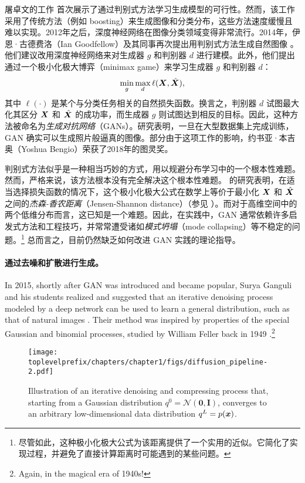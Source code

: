 \documentclass[../../book-main_zh.tex]{subfiles}
\begin{document}
屠卓文的工作 \cite{Tu-2007} 首次展示了通过判别式方法学习生成模型的可行性。然而，该工作采用了传统方法（例如 boosting）来生成图像和分类分布，这些方法速度缓慢且难以实现。2012年之后，深度神经网络在图像分类领域变得非常流行。2014年，伊恩·古德费洛（Ian Goodfellow）及其同事再次提出用判别式方法生成自然图像 \cite{Goodfellow-2014}。他们建议改用深度神经网络来对生成器 $g$ 和判别器 $d$ 进行建模。此外，他们提出通过一个极小化极大博弈（minimax game）来学习生成器 $g$ 和判别器 $d$：
\begin{equation}
    \min_g \max_d \ell(\bm{X}, \hat {\bm{X}}),
\end{equation}
其中 $\ell(\cdot)$ 是某个与分类任务相关的自然损失函数。换言之，判别器 $d$ 试图最大化其区分 $\bm{X}$ 和 $\hat {\bm{X}}$ 的成功率，而生成器 $g$ 则试图达到相反的目标。因此，这种方法被命名为{\em 生成对抗网络}（GANs）。研究表明，一旦在大型数据集上完成训练，GAN 确实可以生成照片般逼真的图像。部分由于这项工作的影响，约书亚·本吉奥（Yoshua Bengio）荣获了2018年的图灵奖。

判别式方法似乎是一种相当巧妙的方式，用以规避分布学习中的一个根本性难题。然而，严格来说，该方法根本没有完全解决这个根本性难题。\cite{Goodfellow-2014} 的研究表明，在适当选择损失函数的情况下，这个极小化极大公式在数学上等价于最小化 $\bm{X}$ 和 $\hat {\bm{X}}$ 之间的{\em 杰森-香农距离}（Jensen-Shannon distance）（参见 \cite{Cover-Thomas}）。而对于高维空间中的两个低维分布而言，这已知是一个难题。因此，在实践中，GAN 通常依赖许多启发式方法和工程技巧，并常常遭受诸如{\em 模式坍塌}（mode collapsing）等不稳定的问题。\footnote{尽管如此，这种极小化极大公式为该距离提供了一个实用的近似。它简化了实现过程，并避免了直接计算距离时可能遇到的某些问题。} 总而言之，目前仍然缺乏如何改进 GAN 实践的理论指导。

\paragraph{通过去噪和扩散进行生成。}

In 2015, shortly after GAN was introduced and became popular, Surya Ganguli and his students realized and suggested that an iterative denoising process modeled by a deep network can be used to learn a general distribution, such as that of natural images \cite{Sohl-Dickstein2015}. Their method was inspired by properties of the special Gaussian and binomial processes, studied by William Feller back in 1949 \cite{Feller1949OnTT}.\footnote{Again, in the magical era of 1940s!} 

\begin{figure}[t]
    \centering
    \texttt{[image: \\toplevelprefix/chapters/chapter1/figs/diffusion\_pipeline-2.pdf]}
    \caption{Illustration of an iterative denoising and compressing process that, starting from a Gaussian distribution $q^0 = \mathcal{N}(\boldsymbol{0}, \boldsymbol{I})$, converges to an arbitrary low-dimensional data distribution $q^L = p(\bm{x})$. }
    \label{fig:diffusion}
\end{figure}
\end{document}
